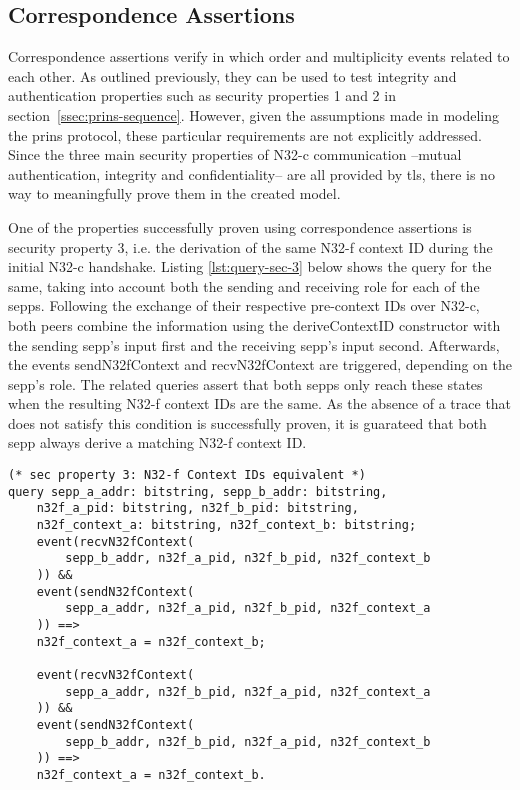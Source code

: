 \subsection{Correspondence Assertions}
\label{ssec:correspondence}

Correspondence assertions verify in which order and multiplicity events related to each other.
As outlined previously, they can be used to test integrity and authentication properties such as security properties 1 and 2 in section~\ref{ssec:prins-sequence}.
However, given the assumptions made in modeling the \gls{prins} protocol, these particular requirements are not explicitly addressed.
Since the three main security properties of N32-c communication --mutual authentication, integrity and confidentiality-- are all provided by \gls{tls}, there is no way to meaningfully prove them in the created model.

One of the properties successfully proven using correspondence assertions is security property 3, i.e. the derivation of the same N32-f context ID during the initial N32-c handshake.
Listing \ref{lst:query-sec-3} below shows the query for the same, taking into account both the sending and receiving role for each of the \glspl{sepp}.
Following the exchange of their respective pre-context IDs over N32-c, both peers combine the information using the {\sffamily deriveContextID} constructor with the sending \gls{sepp}'s input first and the receiving \gls{sepp}'s input second.
Afterwards, the events {\sffamily sendN32fContext} and {\sffamily recvN32fContext} are triggered, depending on the \gls{sepp}'s role.
The related queries assert that both \glspl{sepp} only reach these states when the resulting N32-f context IDs are the same.
As the absence of a trace that does not satisfy this condition is successfully proven, it is guarateed that both \gls{sepp} always derive a matching N32-f context ID.

\begin{lstlisting}[caption={Query for security property 3},label={lst:query-sec-3},firstnumber=328]
(* sec property 3: N32-f Context IDs equivalent *)
query sepp_a_addr: bitstring, sepp_b_addr: bitstring,
    n32f_a_pid: bitstring, n32f_b_pid: bitstring,
    n32f_context_a: bitstring, n32f_context_b: bitstring;
    event(recvN32fContext(
        sepp_b_addr, n32f_a_pid, n32f_b_pid, n32f_context_b
    )) &&
    event(sendN32fContext(
        sepp_a_addr, n32f_a_pid, n32f_b_pid, n32f_context_a
    )) ==>
    n32f_context_a = n32f_context_b;

    event(recvN32fContext(
        sepp_a_addr, n32f_b_pid, n32f_a_pid, n32f_context_a
    )) &&
    event(sendN32fContext(
        sepp_b_addr, n32f_b_pid, n32f_a_pid, n32f_context_b
    )) ==>
    n32f_context_a = n32f_context_b.
\end{lstlisting}

